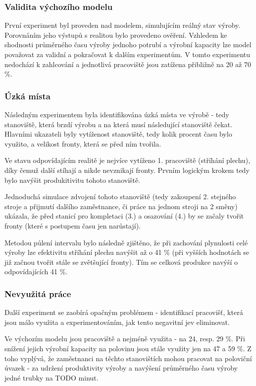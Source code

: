 \documentclass[11pt, a4paper]{article}
\begin{document}
\subsubsection{Validita výchozího modelu}
První experiment byl proveden nad modelem, simulujícím reálný stav výroby. Porovnáním jeho výstupů s realitou bylo provedeno ověření. Vzhledem ke shodnosti průměrného času výroby jednoho potrubí a výrobní kapacity lze model považovat za validní a pokračovat k dalším experimentům. V tomto experimentu nedochází k zahlcování a jednotlivá pracoviště jsou zatížena přibližně na 20 až 70 \%.



\subsubsection{Úzká místa}
Následným experimentem byla identifikována úzká místa ve výrobě - tedy stanoviště, která brzdí výrobu a na která musí následující stanoviště čekat. Hlavními ukazateli byly vytíženost stanoviště, tedy kolik procent času bylo využito, a velikost fronty, která se před ním tvořila.

Ve stavu odpovídajícím realitě je nejvíce vytíženo 1. pracoviště (stříhání plechu), díky čemuž další stíhají a nikde nevznikají fronty. Prvním logickým krokem tedy bylo navýšit produkitivitu tohoto stanoviště.

Jednoduchá simulace zdvojení tohoto stanoviště (tedy zakoupení 2. stejného stroje a přijmutí dalšího zaměstnance, či práce na jednom stroji na 2 směny) ukázala, že před stanicí pro kompletaci (3.) a osazování (4.) by se začaly tvořit fronty (které s postupem času jen narůstají).

Metodou půlení intervalu bylo následně zjištěno, že při zachování plynulosti celé výroby lze efektivitu stříhání plechu navýšit až o 41 \% (při vyšších hodnotách se již začnou tvořit stále se zvětšující fronty). Tím se celková produkce navýší o odpovídajících 41 \%.

\subsubsection{Nevyužitá práce}
Další experiment se zaobírá opačným problémem - identifikací pracovišť, která jsou málo využita a experimentováním, jak tento negavitní jev eliminovat.

Ve výchozím modelu jsou pracoviště  a  nejméně využita - na 24, resp. 29 \%. Při snížení jejich výrobní kapacity na polovinu jsou stále využity jen na 47 a 59 \%. Z toho vyplývá, že zaměstnanci na těchto stanovištích mohou pracovat na poloviční úvazek - za udržení produktivity výroby a navýšení průměrného času výroby jedné trubky na TODO minut.
\end{document}
